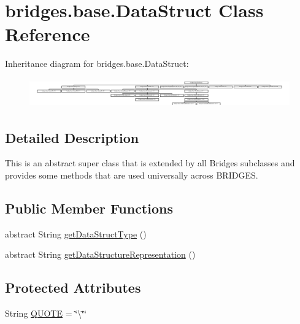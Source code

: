 \hypertarget{classbridges_1_1base_1_1_data_struct}{}\section{bridges.\+base.\+Data\+Struct Class Reference}
\label{classbridges_1_1base_1_1_data_struct}
Inheritance diagram for bridges.\+base.\+Data\+Struct\+:\begin{figure}[H]
\begin{center}
\leavevmode
\includegraphics[height=1.263158cm]{classbridges_1_1base_1_1_data_struct}
\end{center}
\end{figure}


\subsection{Detailed Description}
This is an abstract super class that is extended by all Bridges subclasses and provides some methods that are used universally across B\+R\+I\+D\+G\+ES. 

\subsection*{Public Member Functions}
\begin{DoxyCompactItemize}
\item 
abstract String \mbox{\hyperlink{classbridges_1_1base_1_1_data_struct_a3bae9d0d68a85e517a34be482e90fdd4}{get\+Data\+Struct\+Type}} ()
\item 
abstract String \mbox{\hyperlink{classbridges_1_1base_1_1_data_struct_a21991621db575fd832f7a08233cefdc2}{get\+Data\+Structure\+Representation}} ()
\end{DoxyCompactItemize}
\subsection*{Protected Attributes}
\begin{DoxyCompactItemize}
\item 
String \mbox{\hyperlink{classbridges_1_1base_1_1_data_struct_aac4a6ea28f44676274120ba1dddafc1f}{Q\+U\+O\+TE}} = \char`\"{}\textbackslash{}\char`\"{}\char`\"{}
\end{DoxyCompactItemize}


